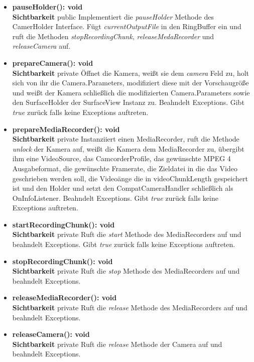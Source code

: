 \begin{itemize}
\item \textbf{pauseHolder(): void}\hfill\\
\textbf{Sichtbarkeit} public\newline
Implementiert die \textit{pauseHolder} Methode des CamerHolder Interface. Fügt \textit{currentOutputFile} in den RingBuffer ein und ruft die Methoden \textit{stopRecordingChunk}, \textit{releaseMedaRecorder} und \textit{releaseCamera} auf.

\item \textbf{prepareCamera(): void}\hfill\\
\textbf{Sichtbarkeit} private \newline
Öffnet die Kamera, weißt sie dem \textit{camera} Feld zu, holt sich von ihr die Camera.Parameters, modifiziert diese mit der Vorschaugröße und weißt der Kamera schließlich die modifizierten Camera.Parameters sowie den SurfaceHolder der SurfaceView Instanz zu.  Beahndelt Exceptions. Gibt \textit{true} zurück falls keine Exceptions auftreten.

\item \textbf{prepareMediaRecorder(): void}\hfill\\
\textbf{Sichtbarkeit} private \newline
Instanziiert einen MediaRecorder, ruft die Methode \textit{unlock} der Kamera auf, weißt die Kamera dem MediaRecorder zu, übergibt ihm eine VideoSource, das CamcorderProfile, das gewünschte MPEG 4 Ausgabeformat, die gewünschte Framerate, die Zieldatei in die das Video geschrieben werden soll, die Videoänge die in videoChunkLength gespeichert ist und den Holder und setzt den CompatCameraHandler schließlich als OnInfoListener.  Beahndelt Exceptions. Gibt \textit{true} zurück falls keine Exceptions auftreten.

\item \textbf{startRecordingChunk(): void}\hfill\\
\textbf{Sichtbarkeit} private \newline
Ruft die \textit{start} Methode des MediaRecorders auf und beahndelt Exceptions. Gibt \textit{true} zurück falls keine Exceptions auftreten.

\item \textbf{stopRecordingChunk(): void}\hfill\\
\textbf{Sichtbarkeit} private \newline
Ruft die \textit{stop} Methode des MediaRecorders auf und beahndelt Exceptions.

\item \textbf{releaseMediaRecorder(): void}\hfill\\
\textbf{Sichtbarkeit} private \newline
Ruft die \textit{release} Methode des MediaRecorders auf und beahndelt Exceptions.

\item \textbf{releaseCamera(): void}\hfill\\
\textbf{Sichtbarkeit} private \newline
Ruft die \textit{release} Methode der Camera auf und beahndelt Exceptions.

\end{itemize}